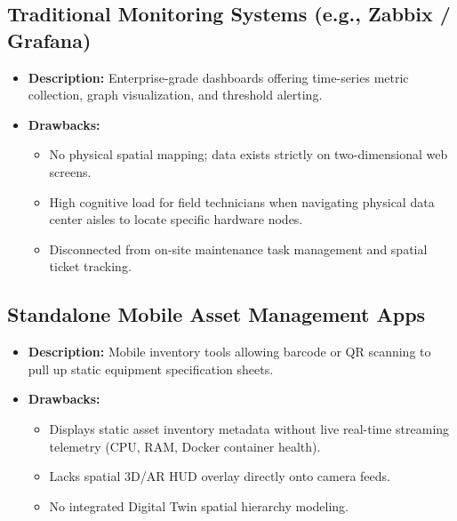 \subsection{Traditional Monitoring Systems (e.g., Zabbix / Grafana)}
\begin{itemize}
    \item \textbf{Description:} Enterprise-grade dashboards offering time-series metric collection, graph visualization, and threshold alerting.
    \item \textbf{Drawbacks:}
    \begin{itemize}
        \item No physical spatial mapping; data exists strictly on two-dimensional web screens.
        \item High cognitive load for field technicians when navigating physical data center aisles to locate specific hardware nodes.
        \item Disconnected from on-site maintenance task management and spatial ticket tracking.
    \end{itemize}
\end{itemize}

\subsection{Standalone Mobile Asset Management Apps}
\begin{itemize}
    \item \textbf{Description:} Mobile inventory tools allowing barcode or QR scanning to pull up static equipment specification sheets.
    \item \textbf{Drawbacks:}
    \begin{itemize}
        \item Displays static asset inventory metadata without live real-time streaming telemetry (CPU, RAM, Docker container health).
        \item Lacks spatial 3D/AR HUD overlay directly onto camera feeds.
        \item No integrated Digital Twin spatial hierarchy modeling.
    \end{itemize}
\end{itemize}

